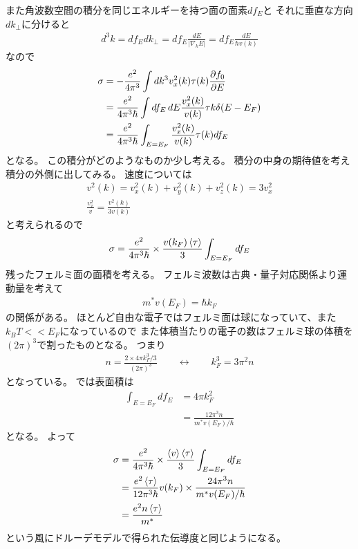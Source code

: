 \documentclass[11pt,dvipdfmx,a4paper]{jsarticle}
\begin{document}
また角波数空間の積分を同じエネルギーを持つ面の面素\(df_E\)と
それに垂直な方向\(dk_{\perp}\)に分けると
\begin{align}
    d^3k =df_Edk_\perp = df_E \frac{dE}{|\nabla_k E|} = df_E \frac{dE}{\hbar v(k)} %
\end{align}
なので
\begin{align}
    \sigma &= -\frac{e^2}{4\pi^3}\int dk^3 v_x^2(k)\tau(k)\pdv{f_0}{E} \\%
    &=\frac{e^2}{4\pi^3\hbar}\int df_E \, dE \frac{v_x^2(k)}{v(k)}\tau{k}\delta(E-E_F) \\%
    &=\frac{e^2}{4\pi^3\hbar}\int_{E=E_F}\frac{v_x^2(k)}{v(k)}\tau(k) df_E \\%
\end{align}
となる。
この積分がどのようなものか少し考える。
積分の中身の期待値を考え積分の外側に出してみる。
速度については
\begin{align}
    v^2(k) = v_x^2(k) + v_y^2(k) + v_z^2(k) = 3 v_x^2\\
    \frac{v_x^2}{v} = \frac{v^2(k)}{3v(k)}
\end{align}
と考えられるので
\begin{align}
    \sigma = \frac{e^2}{4\pi^3\hbar}\times \frac{v(k_F)\ev{\tau}}{3}\int_{E=E_F} df_E
\end{align}
残ったフェルミ面の面積を考える。
フェルミ波数は古典・量子対応関係より運動量を考えて
\begin{align}
    m^*v(E_F) = \hbar k_F %
\end{align}
の関係がある。
ほとんど自由な電子ではフェルミ面は球になっていて、また\(k_BT <<E_F\)になっているので
また体積当たりの電子の数はフェルミ球の体積を\((2\pi)^3\)で割ったものとなる。
つまり
\begin{align}
    n = \frac{2 \times 4 \pi k_F^3/3}{(2\pi)^3} \qquad \leftrightarrow \qquad
    k_F^3 = 3\pi^2n %
\end{align}
となっている。%
では表面積は
\begin{align}
    \int_{E=E_F} df_E &= 4\pi k_F^2\\ %
    &=\frac{12\pi^3n}{m^*v(E_F)/\hbar}
\end{align}
となる。%
よって
\begin{align}
    \sigma &= \frac{e^2}{4\pi^3\hbar}\times \frac{\ev{v}\ev{\tau}}{3}\int_{E=E_F} df_E\\
    &=\frac{e^2\ev{\tau}}{12\pi^3\hbar} v(k_F) \times\frac{24\pi^3n}{m^*v(E_F)/\hbar}\\
    &=\frac{e^2n\ev{\tau}}{m^*}
\end{align}
という風にドルーデモデルで得られた伝導度と同じようになる。
\end{document}
